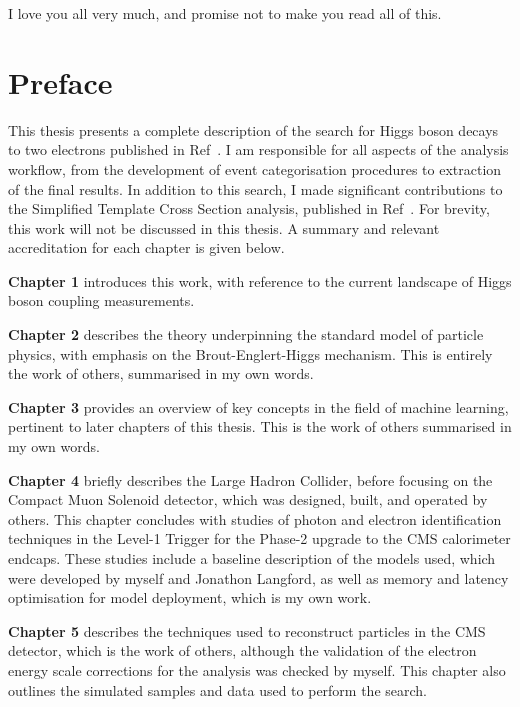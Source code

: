 I love you all very much, and promise not to make you read all of this.







\tableofcontents
\listoffigures
\listoftables

\chapter*{\centering Preface}

This thesis presents a complete description of the search for Higgs boson decays to two electrons published in Ref~\cite{HIG-21-015-PAS}. I am responsible for all aspects of the analysis workflow, from the development of event categorisation procedures to extraction of the final results. In addition to this search, I made significant contributions to the \Hgg Simplified Template Cross Section analysis, published in Ref~\cite{HIG-19-015}. For brevity, this work will not be discussed in this thesis. A summary and relevant accreditation for each chapter is given below.

\textbf{Chapter 1} introduces this work, with reference to the current landscape of Higgs boson coupling measurements.

\textbf{Chapter 2} describes the theory underpinning the standard model of particle physics, with emphasis on the Brout-Englert-Higgs mechanism. This is entirely the work of others, summarised in my own words.

\textbf{Chapter 3} provides an overview of key concepts in the field of machine learning, pertinent to later chapters of this thesis. This is the work of others summarised in my own words.

\textbf{Chapter 4} briefly describes the Large Hadron Collider, before focusing on the Compact Muon Solenoid detector, which was designed, built, and operated by others. This chapter concludes with studies of photon and electron identification techniques in the Level-1 Trigger for the Phase-2 upgrade to the CMS calorimeter endcaps. These studies include a baseline description of the models used, which were developed by myself and Jonathon Langford, as well as memory and latency optimisation for model deployment, which is my own work.

\textbf{Chapter 5} describes the techniques used to reconstruct particles in the CMS detector, which is the work of others, although the validation of the electron energy scale corrections for the \Hee analysis was checked by myself. This chapter also outlines the simulated samples and data used to perform the \Hee search.

